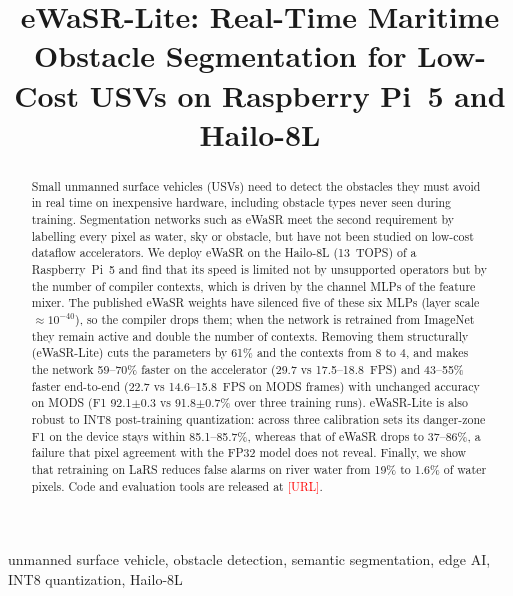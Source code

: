 \documentclass[conference]{IEEEtran}
\newcommand{\tbd}[1]{\textcolor{red}{[#1]}}
\begin{document}
\title{eWaSR-Lite: Real-Time Maritime Obstacle Segmentation for Low-Cost USVs on Raspberry Pi~5 and Hailo-8L}

\author{\IEEEauthorblockN{\tbd{Author 1}}
\IEEEauthorblockA{\tbd{Affiliation}\\
\tbd{email}}
\and
\IEEEauthorblockN{\tbd{Advisor}}
\IEEEauthorblockA{\tbd{Affiliation}\\
\tbd{email}}}

\maketitle

\begin{abstract}
Small unmanned surface vehicles (USVs) need to detect the obstacles they must avoid in real time on inexpensive hardware, including obstacle types never seen during training. Segmentation networks such as eWaSR meet the second requirement by labelling every pixel as water, sky or obstacle, but have not been studied on low-cost dataflow accelerators. We deploy eWaSR on the Hailo-8L (13~TOPS) of a Raspberry~Pi~5 and find that its speed is limited not by unsupported operators but by the number of compiler contexts, which is driven by the channel MLPs of the feature mixer. The published eWaSR weights have silenced five of these six MLPs (layer scale $\approx\!10^{-40}$), so the compiler drops them; when the network is retrained from ImageNet they remain active and double the number of contexts. Removing them structurally (eWaSR-Lite) cuts the parameters by 61\% and the contexts from 8 to 4, and makes the network 59--70\% faster on the accelerator (29.7 vs 17.5--18.8~FPS) and 43--55\% faster end-to-end (22.7 vs 14.6--15.8~FPS on MODS frames) with unchanged accuracy on MODS (F1 92.1$\pm$0.3 vs 91.8$\pm$0.7\% over three training runs). eWaSR-Lite is also robust to INT8 post-training quantization: across three calibration sets its danger-zone F1 on the device stays within 85.1--85.7\%, whereas that of eWaSR drops to 37--86\%, a failure that pixel agreement with the FP32 model does not reveal. Finally, we show that retraining on LaRS reduces false alarms on river water from 19\% to 1.6\% of water pixels. Code and evaluation tools are released at \tbd{URL}.
\end{abstract}

\begin{IEEEkeywords}
unmanned surface vehicle, obstacle detection, semantic segmentation, edge AI, INT8 quantization, Hailo-8L
\end{IEEEkeywords}
\end{document}
